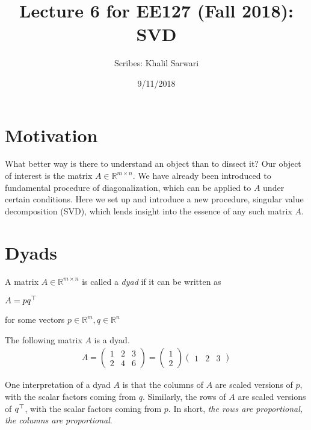 \documentclass[12pt]{article}
\title{Lecture 6 for EE127 (Fall 2018): SVD}
\author{Scribes: Khalil Sarwari}
\date{9/11/2018}
\begin{document}
\maketitle

\section{Motivation}
What better way is there to understand an object than to dissect it? Our object of interest is the matrix $A \in \mathbb{R}^{m \times n}$. We have already been introduced to fundamental procedure of diagonalization, which can be applied to $A$ under certain conditions. Here we set up and introduce a new procedure, singular value decomposition (SVD), which lends insight into the essence of any such matrix $A$.

\section{Dyads}
\begin{definition}
A matrix $A \in \mathbb {R}^{m \times n}$ is called a \textit{dyad} if it can be written as 
\begin{center}
$A = pq^\top$
\end{center}
for some vectors $p \in \mathbb{R}^{m}, q \in \mathbb{R}^{n}$
\end{definition}

\begin{example}
The following matrix $A$ is a dyad.
\begin{gather*}
A = \begin{pmatrix} 1 & 2 & 3 \\ 2 & 4 & 6\end{pmatrix} =  \begin{pmatrix} 1 \\ 2 \end{pmatrix} \begin{pmatrix} 1 & 2 & 3 \end{pmatrix}
\end{gather*}
\end{example}

One interpretation of a dyad $A$ is that the columns of $A$ are scaled versions of $p$, with the scalar factors coming from $q$. Similarly, the rows of $A$ are scaled versions of $q^\top$, with the scalar factors coming from $p$. In short, \textit{the rows are proportional, the columns are proportional}.
\end{document}
